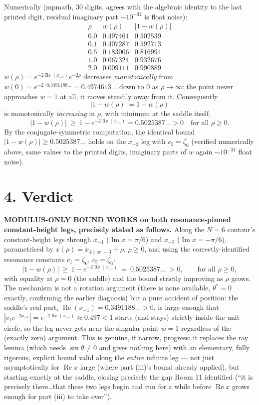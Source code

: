 \documentclass[11pt]{article}
\begin{document}
Numerically (mpmath, 30 digits, agrees with the algebraic identity to the last printed digit,
residual imaginary part $\sim10^{-32}$ is float noise):
\[
\begin{array}{c|c|c}
\rho & w(\rho) & |1-w(\rho)|\\\hline
0.0 & 0.497461 & 0.502539\\
0.1 & 0.407287 & 0.592713\\
0.5 & 0.183006 & 0.816994\\
1.0 & 0.067324 & 0.932676\\
2.0 & 0.009111 & 0.990889
\end{array}
\]
$w(\rho)=e^{-2\operatorname{Re}(x_{-1})}e^{-2\rho}$ decreases \emph{monotonically} from
$w(0)=e^{-2\cdot0.3491188\ldots}=0.4974613\ldots$ down to $0$ as $\rho\to\infty$: the point never
approaches $w=1$ at all, it moves steadily away from it. Consequently
\[
   |1-w(\rho)|=1-w(\rho)
\]
is monotonically \emph{increasing} in $\rho$, with minimum at the saddle itself,
\[
   \boxed{|1-w(\rho)|\ \ge\ 1-e^{-2\operatorname{Re}(x_{-1})}=0.5025387\ldots>0\quad\text{for all }\rho\ge0.}
\]
By the conjugate-symmetric computation, the identical bound $|1-w(\rho)|\ge0.5025387\ldots$ holds on
the $x_{-3}$ leg with $c_5=\overline{\zeta_6}$ (verified numerically above, same values to the
printed digits, imaginary parts of $w$ again $\sim10^{-31}$ float noise).

\section*{4. Verdict}

\textbf{MODULUS-ONLY BOUND WORKS on both resonance-pinned constant-height legs, precisely stated
as follows.} Along the $N=6$ contour's constant-height legs through $x_{-1}$
($\operatorname{Im}x=\pi/6$) and $x_{-3}$ ($\operatorname{Im}x=-\pi/6$), parametrised by
$x(\rho)=x_{\mp1\text{ or }-3}+\rho$, $\rho\ge0$, and using the correctly-identified resonance
constants $c_1=\zeta_6$, $c_5=\overline{\zeta_6}$:
\[
   |1-w(\rho)|\ \ge\ 1-e^{-2\operatorname{Re}(x_{-1})}\ =\ 0.5025387\ldots\ >0,\qquad\text{for all }\rho\ge0,
\]
with equality at $\rho=0$ (the saddle) and the bound strictly improving as $\rho$ grows. The
mechanism is not a rotation argument (there is none available, $\theta^\ast=0$ exactly, confirming
the earlier diagnosis) but a pure accident of position: the saddle's real part,
$\operatorname{Re}(x_{-1})=0.3491188\ldots>0$, is large enough that $|c_1e^{-2x_{-1}}|=
e^{-2\operatorname{Re}(x_{-1})}\approx0.497<1$ starts (and stays) strictly inside the unit circle, so
the leg never gets near the singular point $w=1$ regardless of the (exactly zero) argument. This
is genuine, if narrow, progress: it replaces the ray lemma (which needs $\sin\theta\ne0$ and gives
nothing here) with an elementary, fully rigorous, explicit bound valid along the \emph{entire}
infinite leg --- not just asymptotically for $\operatorname{Re}x$ large (where part (iii)'s bound
already applied), but starting exactly at the saddle, closing precisely the gap Room 11 identified
(``it is precisely there\ldots that these two legs begin and run for a while before
$\operatorname{Re}x$ grows enough for part (iii) to take over'').
\end{document}
